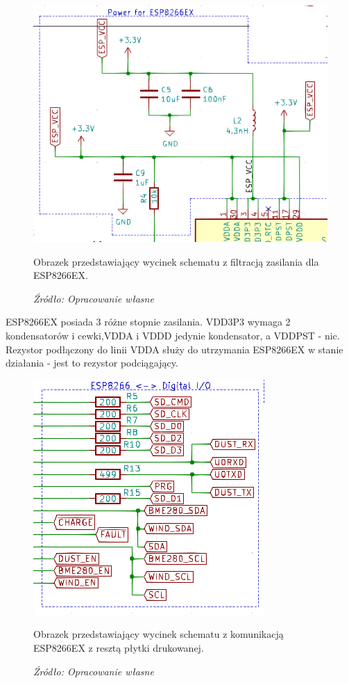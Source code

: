 \documentclass[12pt,a4paper,oneside]{memoir}
\begin{document}
\begin{figure}[!h]
	\centering
	\includegraphics[scale=1.5]{images/sch/sch-07.png}
	{\tytulyrozdzialow \footnotesize \caption[Schemat - filtracja zasilania ESP8266EX] {Obrazek przedstawiający wycinek schematu z filtracją zasilania dla ESP8266EX.}}
	\caption*{\textit{Źródło: Opracowanie własne}}
\end{figure}
\par ESP8266EX posiada 3 różne stopnie zasilania. VDD3P3 wymaga 2 kondensatorów i cewki,VDDA i VDDD jedynie kondensator, a VDDPST - nic. Rezystor podłączony do linii VDDA służy do utrzymania ESP8266EX w stanie działania - jest to rezystor podciągający.
\newpage
\begin{figure}[!h]
	\centering
	\includegraphics[scale=0.55]{images/sch/sch-08.png}
	{\tytulyrozdzialow \footnotesize \caption[Schemat - komunikacja ESP8266EX z resztą płytki] {Obrazek przedstawiający wycinek schematu z komunikacją ESP8266EX z resztą płytki drukowanej.}}
	\caption*{\textit{Źródło: Opracowanie własne}}
\end{figure}
\end{document}
